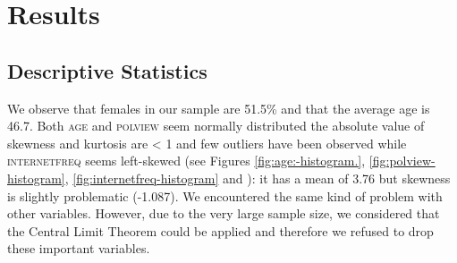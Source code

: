 
\lhead[\leftmark]{\leftmark}

\rhead[\leftmark]{}

\lfoot{}

\rfoot{}

\cfoot[\thepage]{\thepage}

\chapter{Results}

\section{Descriptive Statistics}

We observe that females in our sample are 51.5\% and that the average
age is 46.7. Both \textsc{age} and \textsc{polview} seem normally
distributed \textendash{} the absolute value of skewness and kurtosis
are < 1 and few outliers have been observed \textendash{} while \textsc{internetfreq}
seems left-skewed (see Figures \ref{fig:age:-histogram.}, \ref{fig:polview-histogram},
\ref{fig:internetfreq-histogram} and ):
it has a mean of 3.76 but skewness is slightly problematic (-1.087).
We encountered the same kind of problem with other variables. However,
due to the very large sample size, we considered that the Central
Limit Theorem could be applied and therefore we refused to drop these
important variables. 

